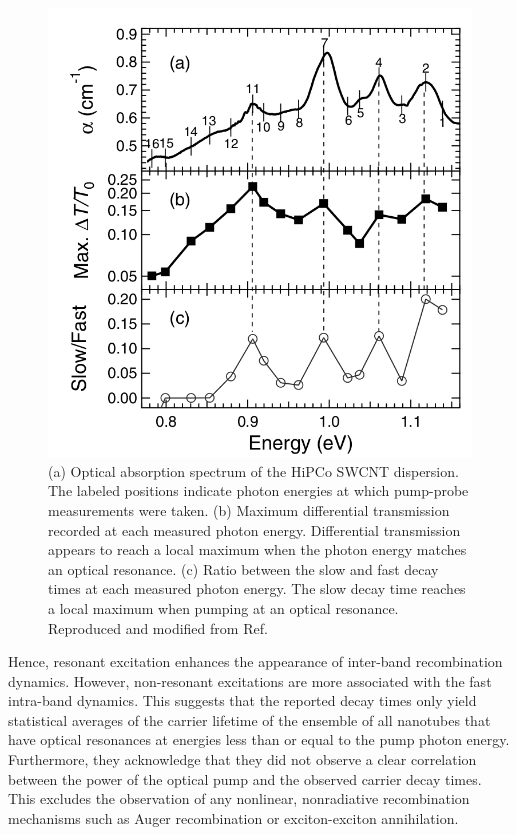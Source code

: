 \begin{figure}[ht]
	\centering
	\includegraphics[scale=0.3]{images/chapter_prior_works/wavelength_dependence_gordana}
	\caption{(a) Optical absorption spectrum of the HiPCo SWCNT dispersion. The labeled positions indicate photon energies at which pump-probe measurements were taken. (b) Maximum differential transmission recorded at each measured photon energy. Differential transmission appears to reach a local maximum when the photon energy matches an optical resonance. (c) Ratio between the slow and fast decay times at each measured photon energy. The slow decay time reaches a local maximum when pumping at an optical resonance. Reproduced and modified from Ref.\ \cite{ostojic2004interband}}
	\label{fig:wl_dep_gordana}
\end{figure}

Hence, resonant excitation enhances the appearance of inter-band recombination dynamics. However, non-resonant excitations are more associated with the fast intra-band dynamics. This suggests that the reported decay times only yield statistical averages of the carrier lifetime of the ensemble of all nanotubes that have optical resonances at energies less than or equal to the pump photon energy. Furthermore, they acknowledge that they did not observe a clear correlation between the power of the optical pump and the observed carrier decay times. This excludes the observation of any nonlinear, nonradiative recombination mechanisms such as Auger recombination or exciton-exciton annihilation.

